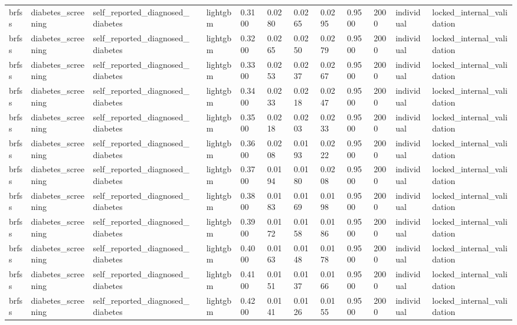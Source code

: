 \begin{tabular}{lllllllllllll}
brfss & diabetes\_screening & self\_reported\_diagnosed\_diabetes &  & lightgbm & 0.3100 & 0.0280 & 0.0265 & 0.0295 & 0.9500 & 2000 & individual & locked\_internal\_validation \\
brfss & diabetes\_screening & self\_reported\_diagnosed\_diabetes &  & lightgbm & 0.3200 & 0.0265 & 0.0250 & 0.0279 & 0.9500 & 2000 & individual & locked\_internal\_validation \\
brfss & diabetes\_screening & self\_reported\_diagnosed\_diabetes &  & lightgbm & 0.3300 & 0.0253 & 0.0237 & 0.0267 & 0.9500 & 2000 & individual & locked\_internal\_validation \\
brfss & diabetes\_screening & self\_reported\_diagnosed\_diabetes &  & lightgbm & 0.3400 & 0.0233 & 0.0218 & 0.0247 & 0.9500 & 2000 & individual & locked\_internal\_validation \\
brfss & diabetes\_screening & self\_reported\_diagnosed\_diabetes &  & lightgbm & 0.3500 & 0.0218 & 0.0203 & 0.0233 & 0.9500 & 2000 & individual & locked\_internal\_validation \\
brfss & diabetes\_screening & self\_reported\_diagnosed\_diabetes &  & lightgbm & 0.3600 & 0.0208 & 0.0193 & 0.0222 & 0.9500 & 2000 & individual & locked\_internal\_validation \\
brfss & diabetes\_screening & self\_reported\_diagnosed\_diabetes &  & lightgbm & 0.3700 & 0.0194 & 0.0180 & 0.0208 & 0.9500 & 2000 & individual & locked\_internal\_validation \\
brfss & diabetes\_screening & self\_reported\_diagnosed\_diabetes &  & lightgbm & 0.3800 & 0.0183 & 0.0169 & 0.0198 & 0.9500 & 2000 & individual & locked\_internal\_validation \\
brfss & diabetes\_screening & self\_reported\_diagnosed\_diabetes &  & lightgbm & 0.3900 & 0.0172 & 0.0158 & 0.0186 & 0.9500 & 2000 & individual & locked\_internal\_validation \\
brfss & diabetes\_screening & self\_reported\_diagnosed\_diabetes &  & lightgbm & 0.4000 & 0.0163 & 0.0148 & 0.0178 & 0.9500 & 2000 & individual & locked\_internal\_validation \\
brfss & diabetes\_screening & self\_reported\_diagnosed\_diabetes &  & lightgbm & 0.4100 & 0.0151 & 0.0137 & 0.0166 & 0.9500 & 2000 & individual & locked\_internal\_validation \\
brfss & diabetes\_screening & self\_reported\_diagnosed\_diabetes &  & lightgbm & 0.4200 & 0.0141 & 0.0126 & 0.0155 & 0.9500 & 2000 & individual & locked\_internal\_validation \\

\end{tabular}
